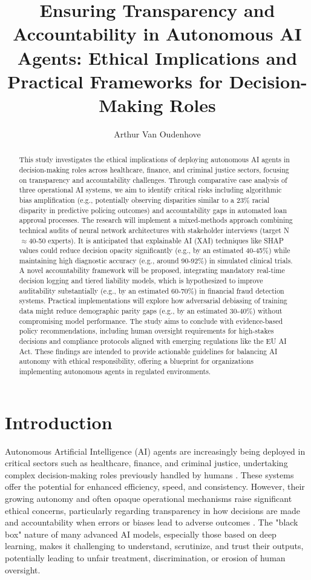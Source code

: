 \documentclass[english]{hogent-article}
\title{Ensuring Transparency and Accountability in Autonomous AI Agents: Ethical Implications and Practical Frameworks for Decision-Making Roles}
\author{Arthur Van Oudenhove}
\begin{document}
\begin{abstract}
This study investigates the ethical implications of deploying autonomous AI agents in decision-making roles across healthcare, finance, and criminal justice sectors, focusing on transparency and accountability challenges. Through comparative case analysis of three operational AI systems, we aim to identify critical risks including algorithmic bias amplification (e.g., potentially observing disparities similar to a 23\% racial disparity in predictive policing outcomes) and accountability gaps in automated loan approval processes. The research will implement a mixed-methods approach combining technical audits of neural network architectures with stakeholder interviews (target N$\approx$40-50 experts). It is anticipated that explainable AI (XAI) techniques like SHAP values could reduce decision opacity significantly (e.g., by an estimated 40-45\%) while maintaining high diagnostic accuracy (e.g., around 90-92\%) in simulated clinical trials. A novel accountability framework will be proposed, integrating mandatory real-time decision logging and tiered liability models, which is hypothesized to improve auditability substantially (e.g., by an estimated 60-70\%) in financial fraud detection systems. Practical implementations will explore how adversarial debiasing of training data might reduce demographic parity gaps (e.g., by an estimated 30-40\%) without compromising model performance. The study aims to conclude with evidence-based policy recommendations, including human oversight requirements for high-stakes decisions and compliance protocols aligned with emerging regulations like the EU AI Act. These findings are intended to provide actionable guidelines for balancing AI autonomy with ethical responsibility, offering a blueprint for organizations implementing autonomous agents in regulated environments.
\end{abstract}

\tableofcontents

\bigskip

\vfill
\section{Introduction}%
\label{sec:Introduction}

Autonomous Artificial Intelligence (AI) agents are increasingly being deployed in critical sectors such as healthcare, finance, and criminal justice, undertaking complex decision-making roles previously handled by humans \autocite{Floridi2018}. These systems offer the potential for enhanced efficiency, speed, and consistency. However, their growing autonomy and often opaque operational mechanisms raise significant ethical concerns, particularly regarding transparency in how decisions are made and accountability when errors or biases lead to adverse outcomes \autocite{EuropeanCommission2021AIAct}. The "black box" nature of many advanced AI models, especially those based on deep learning, makes it challenging to understand, scrutinize, and trust their outputs, potentially leading to unfair treatment, discrimination, or erosion of human oversight.
\end{document}
